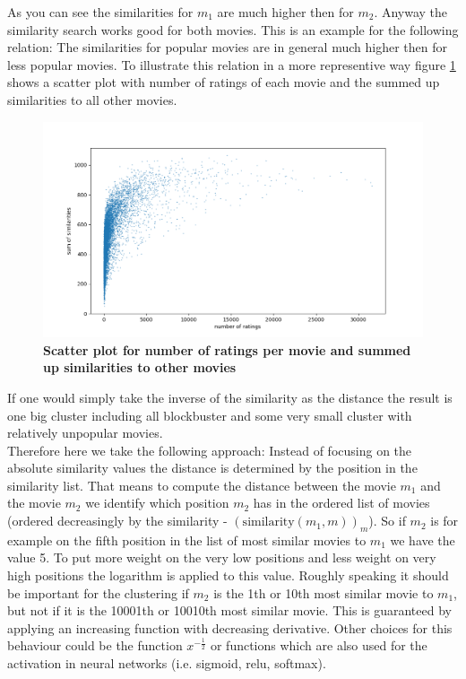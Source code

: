 \documentclass{article}
\begin{document}
As you can see the similarities for $m_1$ are much higher then for $m_2$. Anyway the similarity search works good for both movies. This is an example for the following relation: The similarities for popular movies are in general much higher then for less popular movies. To illustrate this relation in a more representive way  figure \ref{fig_scatter_nr_ratings_similarity} shows a scatter plot with number of ratings of each movie and the summed  up similarities to all other movies.
\begin{figure}[t!]
\includegraphics[scale=0.5]{screenshots_app/scatter_nr_ratings_similarity.png}
\caption{\textbf{Scatter plot for number of ratings per movie and summed up similarities to other movies}}\label{fig_scatter_nr_ratings_similarity}
\end{figure}
If one would simply take the inverse of the similarity as the distance the result is one big cluster including all blockbuster and some very small cluster with relatively unpopular movies.\\
Therefore here we take the following approach: Instead of focusing on the absolute similarity values the distance is determined by the position in the similarity list. That means to compute the distance between the movie $m_1$ and the movie $m_2$ we identify which position $m_2$ has in the ordered list of movies (ordered  decreasingly by the similarity - $(\text{similarity}(m_1,m))_m$). So if $m_2$ is for example on the fifth position in the list of most similar movies to $m_1$ we have the value 5. To put more weight on the very low positions and less weight on very high positions the logarithm is applied to this value. Roughly speaking it should be important for the clustering if $m_2$ is the 1th or 10th most similar movie to $m_1$, but not if it is the 10001th or 10010th most similar movie. This is guaranteed by applying an increasing function with decreasing derivative. Other choices for this behaviour could be the function $x^{-\frac{1}{2}}$ or functions which are also used for the activation in neural networks (i.e. sigmoid, relu, softmax).
\end{document}
